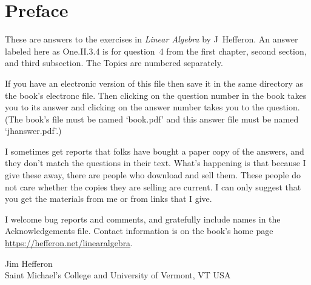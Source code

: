 \documentclass[twoside]{book}
\begin{document}

\frontmatter
\chapter*{Preface}
These are answers to the exercises in \textit{Linear Algebra} by
J~Hef{}feron.
An answer labeled here as
One.II.3.4 is for question~4 
from the first chapter,
second section, and third subsection.
The Topics are numbered separately.

If you have an electronic version of this file then
save it in the same directory as the book's electronc file.
Then
clicking on the question number in the book takes you to its answer
and clicking on the answer number takes you to the question.
(The book's file must be named `book.pdf' and this answer file must be
named `jhanswer.pdf'.)

I sometimes get reports that folks have bought a paper copy of the answers,
and they don't match the questions in their text.
What's happening is that because I give these away, there are people who
download and sell them.
These people do not care whether the copies they are selling are current.
I can only suggest that you get the materials from me or from links
that I give.

I welcome bug reports and comments, and gratefully include names in 
the Acknowledgements file.
Contact information is on the book's home page 
\url{https://hefferon.net/linearalgebra}.

\vspace{.5in}
\begin{raggedright}
Jim Hef{}feron     \\
Saint Michael's College and University of Vermont, VT USA \\

\end{raggedright}
\clearemptydoublepage\tableofcontents
\setcounter{page}{1}
\mainmatter
\thispagestyle{empty}

\end{document}
